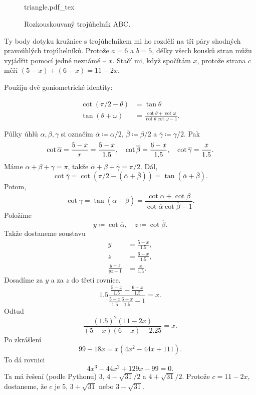 \documentclass[a4paper,11pt]{article}
\title{\Huge\textsf{}\\
 \Large\textsf{}
 \author{}
 \date{}
}
\begin{document}
\begin{figure}[t]
 \centering
 \def\svgwidth{\textwidth}
 {triangle.pdf_tex}
 \caption*{Rozkouskouvaný trojúhelník ABC.}
\end{figure}

Ty body dotyku kružnice s trojúhelníkem mi ho rozdělí na tři páry shodných
pravoúhlých trojúhelníků. Protože $a = 6$ a $b = 5$, délky všech kousků stran
můžu vyjádřit pomocí jedné neznámé -- $x$. Stačí mi, když spočítám $x$, protože
strana $c$ měří $(5 - x) + (6 - x) = 11 - 2x$.

Použiju dvě goniometrické identity:
\begin{framed}
 \begin{align*}
  \cot(\pi / 2 - \theta) &= \tan\theta\\
  \tan(\theta + \omega) &= \frac{\cot\theta + \cot\omega}{\cot\theta\cot\omega -
  1}.
 \end{align*}
\end{framed}

Půlky úhlů $\alpha, \beta, \gamma$ si označím $\overline{\alpha} \coloneqq
\alpha / 2$, $\overline{\beta} \coloneqq \beta / 2$ a $\overline{\gamma}
\coloneqq \gamma / 2$. Pak
\[
 \cot \overline{\alpha} = \frac{5-x}{r} = \frac{5-x}{1.5}, \quad 
 \cot \overline{\beta} = \frac{6-x}{1.5}, \quad 
 \cot \overline{\gamma} = \frac{x}{1.5}. \\
\]
Máme $\alpha + \beta + \gamma = \pi$, takže $\overline{\alpha} +
\overline{\beta} + \overline{\gamma} = \pi / 2$. Dál,
\[
 \cot \overline{\gamma} = \cot(\pi / 2 - (\overline{\alpha} + \overline{\beta}))
 = \tan(\overline{\alpha} + \overline{\beta}).
\]
Potom,
\[
 \cot \overline{\gamma} = \tan(\overline{\alpha} + \overline{\beta}) =
 \frac{\cot \overline{\alpha} + \cot \overline{\beta}}{\cot \overline{\alpha}
 \cot \overline{\beta} - 1}.
\]
Položíme
\[
 y \coloneqq \cot \overline{\alpha}, \quad z \coloneqq \cot \overline{\beta}.
\]
Takže dostaneme soustavu
\begin{align*}
 y &= \frac{5 - x}{1.5}, \\
 z &= \frac{6 - x}{1.5}, \\
 \frac{y + z}{yz - 1} &= \frac{x}{1.5}.
\end{align*}
Dosadíme za $y$ a za $z$ do třetí rovnice.
\[
 1.5\frac{\frac{5-x}{1.5} + \frac{6-x}{1.5}}{\frac{5-x}{1.5}\frac{6-x}{1.5} -
 1} = x.
\]
Odtud
\[
 \frac{(1.5)^2(11 - 2x)}{(5 - x)(6 - x) - 2.25} = x.
\]
Po zkrášlení
\[
 99 - 18x = x(4x^2 - 44x + 111).
\]
To dá rovnici
\[
 4x^3 - 44x^2 + 129x - 99 = 0.
\]
Ta má řešení (podle Pythonu) $3$, $4 - \sqrt{31} / 2$ a $4 + \sqrt{31} / 2$.
Protože $c = 11 - 2x$, dostaneme, že $c$ je $5$, $3 + \sqrt{31}$ nebo $3 -
\sqrt{31}$.
\end{document}
